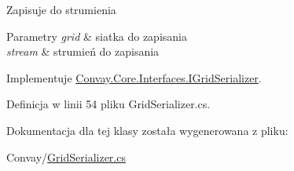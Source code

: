 Zapisuje do strumienia 


\begin{DoxyParams}{Parametry}
{\em grid} & siatka do zapisania\\
\hline
{\em stream} & strumień do zapisania\\
\hline
\end{DoxyParams}


Implementuje \hyperlink{interface_convay_1_1_core_1_1_interfaces_1_1_i_grid_serializer_ac8de4f85acd03d95f73a7c7f85db43b2}{Convay.\+Core.\+Interfaces.\+I\+Grid\+Serializer}.



Definicja w linii 54 pliku Grid\+Serializer.\+cs.



Dokumentacja dla tej klasy została wygenerowana z pliku\+:\begin{DoxyCompactItemize}
\item 
Convay/\hyperlink{_grid_serializer_8cs}{Grid\+Serializer.\+cs}\end{DoxyCompactItemize}
